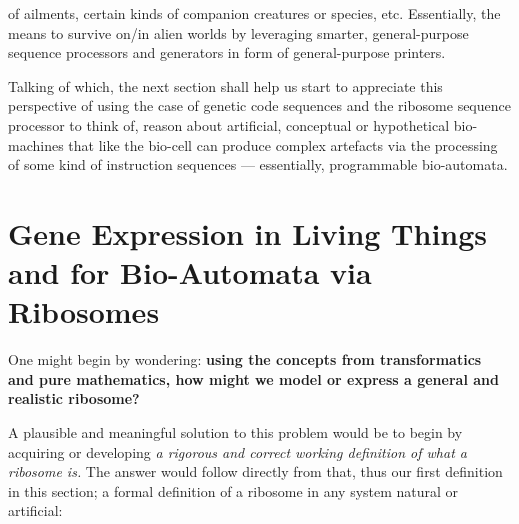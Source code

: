 \documentclass[a4paper, 18pt]{book} %
\begin{document}
of ailments, certain kinds of companion creatures or species, etc. Essentially, the means to survive on/in alien worlds by leveraging smarter, general-purpose sequence processors and generators in form of general-purpose printers. 

Talking of which, the next section shall help us start to appreciate this perspective of using the case of genetic code sequences and the ribosome sequence processor to think of, reason about artificial, conceptual or hypothetical bio-machines that like the bio-cell can produce complex artefacts via the processing of some kind of instruction sequences --- essentially, programmable bio-automata.

\section{Gene Expression in Living Things and for Bio-Automata via Ribosomes}
\label{SEC5}

One might begin by wondering: \textbf{using the concepts from transformatics and pure mathematics, how might we model or express a general and realistic ribosome?} 

A plausible and meaningful solution to this problem would be to begin by acquiring or developing \textit{a rigorous and correct working definition of what a ribosome is.} The answer would follow directly from that, thus our first definition in this section; a formal definition of a ribosome in any system natural or artificial:


\end{document}
